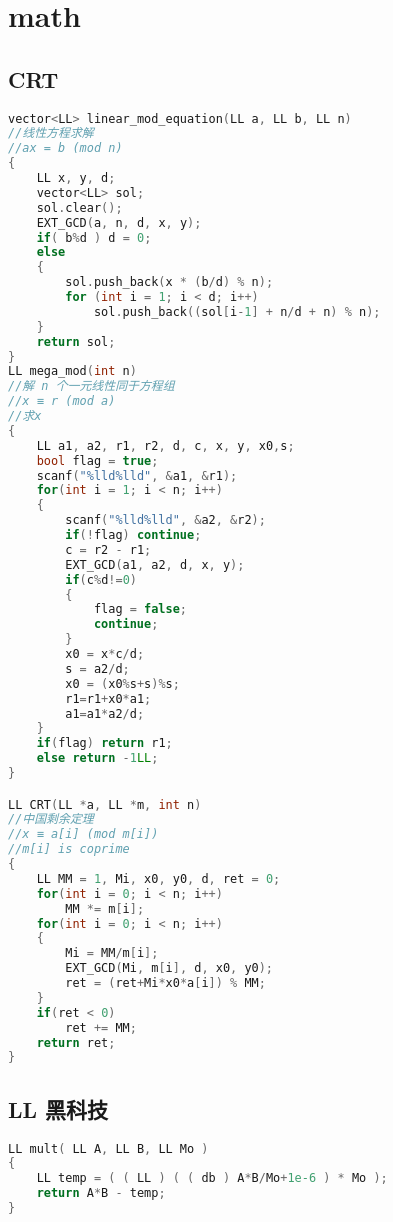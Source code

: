 \section{math}
\subsection{CRT}
\begin{lstlisting}[language=C++]
vector<LL> linear_mod_equation(LL a, LL b, LL n)
//线性方程求解
//ax = b (mod n)
{
    LL x, y, d;
    vector<LL> sol;
    sol.clear();
    EXT_GCD(a, n, d, x, y);
    if( b%d ) d = 0;
    else
    {
        sol.push_back(x * (b/d) % n);
        for (int i = 1; i < d; i++)
            sol.push_back((sol[i-1] + n/d + n) % n);
    }
    return sol;
}
LL mega_mod(int n)
//解 n 个一元线性同于方程组
//x ≡ r (mod a)
//求x
{
    LL a1, a2, r1, r2, d, c, x, y, x0,s;
    bool flag = true;
    scanf("%lld%lld", &a1, &r1);
    for(int i = 1; i < n; i++)
    {
        scanf("%lld%lld", &a2, &r2);
        if(!flag) continue;
        c = r2 - r1;
        EXT_GCD(a1, a2, d, x, y);
        if(c%d!=0)
        {
            flag = false;
            continue;
        }
        x0 = x*c/d;
        s = a2/d;
        x0 = (x0%s+s)%s;
        r1=r1+x0*a1;
        a1=a1*a2/d;
    }
    if(flag) return r1;
    else return -1LL;
}

LL CRT(LL *a, LL *m, int n)
//中国剩余定理
//x ≡ a[i] (mod m[i])
//m[i] is coprime
{
    LL MM = 1, Mi, x0, y0, d, ret = 0;
    for(int i = 0; i < n; i++)
        MM *= m[i];
    for(int i = 0; i < n; i++)
    {
        Mi = MM/m[i];
        EXT_GCD(Mi, m[i], d, x0, y0);
        ret = (ret+Mi*x0*a[i]) % MM;
    }
    if(ret < 0)
        ret += MM;
    return ret;
}
\end{lstlisting}
\subsection{LL 黑科技}
\begin{lstlisting}[language=C++]
LL mult( LL A, LL B, LL Mo )
{
    LL temp = ( ( LL ) ( ( db ) A*B/Mo+1e-6 ) * Mo );
    return A*B - temp;
}
\end{lstlisting}

